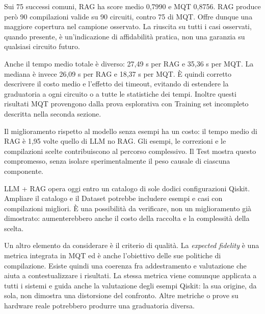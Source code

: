Sui 75 successi comuni, RAG ha score medio 0,7990 e MQT 0,8756. RAG produce però 90 compilazioni valide su 90 circuiti, contro 75 di MQT. Offre dunque una maggiore copertura nel campione osservato. La riuscita su tutti i casi osservati, quando presente, è un’indicazione di affidabilità pratica, non una garanzia su qualsiasi circuito futuro.

Anche il tempo medio totale è diverso: 27,49 s per RAG e 35,36 s per MQT. La mediana è invece 26,09 s per RAG e 18,37 s per MQT. È quindi corretto descrivere il costo medio e l’effetto dei timeout, evitando di estendere la graduatoria a ogni circuito o a tutte le statistiche dei tempi. Inoltre questi risultati MQT provengono dalla prova esplorativa con Training set incompleto descritta nella seconda sezione.

Il miglioramento rispetto al modello senza esempi ha un costo: il tempo medio di RAG è 1,95 volte quello di LLM no RAG. Gli esempi, le correzioni e le compilazioni scelte contribuiscono al percorso complessivo. Il Test mostra questo compromesso, senza isolare sperimentalmente il peso causale di ciascuna componente.

LLM + RAG opera oggi entro un catalogo di sole dodici configurazioni Qiskit. Ampliare il catalogo e il Dataset potrebbe includere esempi e casi con compilazioni migliori. È una possibilità da verificare, non un miglioramento già dimostrato: aumenterebbero anche il costo della raccolta e la complessità della scelta.

Un altro elemento da considerare è il criterio di qualità. La \emph{expected fidelity} è una metrica integrata in MQT ed è anche l’obiettivo delle sue politiche di compilazione. Esiste quindi una coerenza fra addestramento e valutazione che aiuta a contestualizzare i risultati. La stessa metrica viene comunque applicata a tutti i sistemi e guida anche la valutazione degli esempi Qiskit: la sua origine, da sola, non dimostra una distorsione del confronto. Altre metriche o prove su hardware reale potrebbero produrre una graduatoria diversa.

